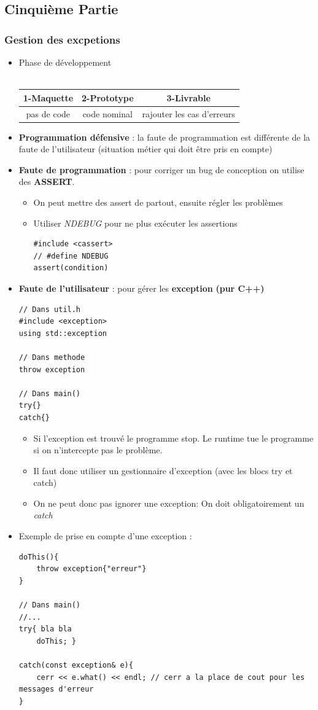 \documentclass[12pt,a4paper]{article}
\begin{document}
\subsection{Cinquième Partie}
\subsubsection{Gestion des excpetions}
\begin{itemize}
\item Phase de développement \\\\
\begin{tabular}{|c|c|c|}
  \hline
  1-Maquette & 2-Prototype & 3-Livrable \\ \hline
  pas de code & code nominal & rajouter les cas d'erreurs\\\hline
\end{tabular}
\item \textbf{Programmation défensive} : la faute de programmation est différente de la faute de l'utilisateur (situation métier qui doit être pris en compte)
\item \textbf{Faute de programmation} : pour corriger un bug de conception on utilise des \textbf{ASSERT}.
\begin{itemize}
\item On peut mettre des assert de partout, ensuite régler les problèmes
\item Utiliser \textit{NDEBUG} pour ne plus exécuter les assertions
\begin{lstlisting}
#include <cassert>
// #define NDEBUG
assert(condition)
\end{lstlisting}
\end{itemize}
\item \textbf{Faute de l'utilisateur} : pour gérer les \textbf{exception} \textbf{(pur C++)}
\begin{lstlisting}
// Dans util.h
#include <exception>
using std::exception

// Dans methode
throw exception

// Dans main()
try{}
catch{}
\end{lstlisting}
\begin{itemize}
\item Si l'exception est trouvé le programme stop. Le runtime tue le programme si on n'intercepte pas le problème.
\item Il faut donc utiliser un gestionnaire d'exception (avec les blocs try et catch)
\item On ne peut donc pas ignorer une exception: On doit obligatoirement un \textit{catch{}}
\end{itemize}
\item Exemple de prise en compte d'une exception :
\begin{lstlisting}
doThis(){
	throw exception{"erreur"}
}

// Dans main()
//...
try{ bla bla
	doThis; }

catch(const exception& e){
	cerr << e.what() << endl; // cerr a la place de cout pour les messages d'erreur
}
\end{lstlisting}
\end{itemize}
\end{document}
